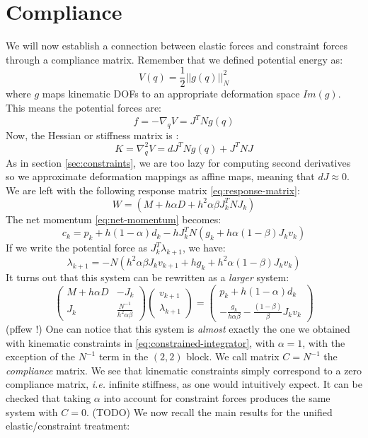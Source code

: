 \documentclass{article}
\newcommand{\half}{\frac{1}{2}}
\newcommand{\norm}[1]{\left|\left|#1\right|\right|}
\newcommand{\dd}{d}
\newcommand{\block}[1]{\left(#1\right)}
\newcommand{\mat}[1]{ \begin{pmatrix} #1 \end{pmatrix} }
\newcommand{\inv}[1]{#1^{-1}}
\begin{document}
\section{Compliance}
\label{sec:compliance}
%
We will now establish a connection between elastic forces and
constraint forces through a compliance matrix. Remember that we
defined potential energy as:
%
\begin{equation}
  V(q) = \half \norm{g(q)}_N^2
\end{equation}
%
where $g$ maps kinematic DOFs to an appropriate deformation space
$Im(g)$. This means the potential forces are:
%
\begin{equation}
  f = - \nabla_q V = J^T N g(q)
\end{equation}
%
Now, the Hessian or stiffness matrix is :
%
\begin{equation}
  K = \nabla^2_q V = \dd J^T N g(q) + J^T N J
\end{equation}
%
As in section \ref{sec:constraints}, we are too lazy for computing
second derivatives so we approximate deformation mappings as affine
maps, meaning that $\dd J \approx 0$. We are left with the following
response matrix \eqref{eq:response-matrix}:
%
\begin{equation}
  W = \block{M + h\alpha D + h^2 \alpha \beta J_k^T N J_k}
\end{equation}
%
The net momentum \eqref{eq:net-momentum} becomes:
%
\begin{equation}
  c_k = p_k + h (1 - \alpha) d_k - h J_k^TN \block{ g_k + h \alpha ( 1 - \beta) J_k v_k}
\end{equation}
%
If we write the potential force as $J_k^T \lambda_{k+1}$, we have: 
\begin{equation}
  \lambda_{k+1} = -N\block{h^2 \alpha \beta J_k v_{k+1} + h g_k + h^2 \alpha (1 - \beta) J_k v_k}
\end{equation}
It turns out that this system can be rewritten as a \emph{larger} system:
%
\begin{equation}
  \mat{M + h \alpha D & -J_k \\
    J_k & \frac{\inv{N}}{h^2 \alpha \beta} } \mat{v_{k+1} \\ \lambda_{k+1}} = \mat{p_k + h (1 - \alpha) d_k \\ -\frac{g_k}{h \alpha \beta} - \frac{( 1 - \beta)}{\beta} J_k v_k }
\end{equation}
%
(pffew !) One can notice that this system is \emph{almost} exactly the
one we obtained with kinematic constraints in
\eqref{eq:constrained-integrator}, with $\alpha = 1$, with the
exception of the $\inv{N}$ term in the $(2, 2)$ block. We call matrix
$C = \inv{N}$ the \emph{compliance} matrix. We see that kinematic
constraints simply correspond to a zero compliance matrix, \emph{i.e.}
infinite stiffness, as one would intuitively expect. It can be checked
that taking $\alpha$ into account for constraint forces produces the
same system with $C = 0$. (TODO) We now recall the main results for
the unified elastic/constraint treatment:
%
\end{document}
